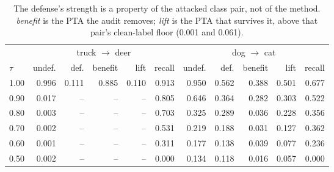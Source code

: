 \begin{table}[t]
\centering
\small
\begin{tabular}{lrrrrrrrrrr}
\toprule
& \multicolumn{5}{c}{truck $\to$ deer} & \multicolumn{5}{c}{dog $\to$ cat} \\
\cmidrule(lr){2-6}\cmidrule(lr){7-11}
$\tau$ & undef. & def. & benefit & lift & recall & undef. & def. & benefit & lift & recall \\
\midrule
1.00 & 0.996 & 0.111 & 0.885 & 0.110 & 0.913 & 0.950 & 0.562 & 0.388 & 0.501 & 0.677 \\
0.90 & 0.017 & -- & -- & -- & 0.805 & 0.646 & 0.364 & 0.282 & 0.303 & 0.522 \\
0.80 & 0.003 & -- & -- & -- & 0.703 & 0.325 & 0.289 & 0.036 & 0.228 & 0.356 \\
0.70 & 0.002 & -- & -- & -- & 0.531 & 0.219 & 0.188 & 0.031 & 0.127 & 0.362 \\
0.60 & 0.001 & -- & -- & -- & 0.311 & 0.177 & 0.138 & 0.039 & 0.077 & 0.236 \\
0.50 & 0.002 & -- & -- & -- & 0.000 & 0.134 & 0.118 & 0.016 & 0.057 & 0.000 \\
\bottomrule
\end{tabular}
\caption{The defense's strength is a property of the attacked class pair, not of the method. \emph{benefit} is the PTA the audit removes; \emph{lift} is the PTA that survives it, above that pair's clean-label floor (0.001 and 0.061).}
\label{tab:pair_comparison}
\end{table}

